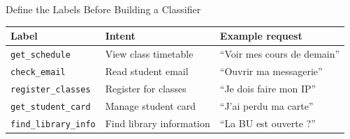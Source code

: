 \documentclass[aspectratio=169]{beamer}
\begin{document}
\begin{frame}{Define the Labels Before Building a Classifier}
  \small
  \begin{tabular}{@{}p{4.2cm}>{\raggedright\arraybackslash}p{3.1cm}p{5.0cm}@{}}
    \toprule
    \textbf{Label} & \textbf{Intent} & \textbf{Example request} \\
    \midrule
    \texttt{get\_schedule} & View class timetable & ``Voir mes cours de demain'' \\
    \texttt{check\_email} & Read student email & ``Ouvrir ma messagerie'' \\
    \texttt{register\_classes} & Register for classes & ``Je dois faire mon IP'' \\
    \texttt{get\_student\_card} & Manage student card & ``J'ai perdu ma carte'' \\
    \texttt{find\_library\_info} & Find library information & ``La BU est ouverte ?'' \\
    \bottomrule
  \end{tabular}
\end{frame}
\end{document}
